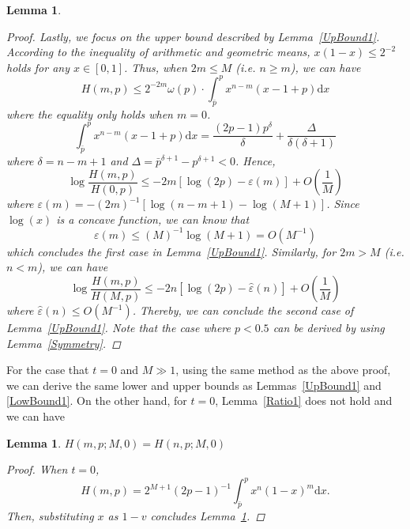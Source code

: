 \documentclass{article}
\newtheorem{lemma}[theorem]{Lemma}
\begin{document}
\begin{lemma}
\begin{proof}
Lastly, we focus on the upper bound described by Lemma~\ref{UpBound1}. According to the inequality of arithmetic and geometric means, $x(1-x)\leq 2^{-2}$ holds for any $x\in [0,1]$. Thus, when $2m\leq M$ (i.e. $n\geq m$), we can have
\begin{equation}
H(m,p)\leq 2^{-2m}\omega(p)\cdot \int_{\bar{p}}^{p}x^{n-m}(x-1+p)\mathrm{d}x
\end{equation}
where the equality only holds when $m=0$.
\begin{equation}
 \int_{\bar{p}}^{p}x^{n-m}(x-1+p)\mathrm{d}x=\frac{(2p-1)p^{\delta}}{\delta}+\frac{\Delta}{\delta(\delta+1)}
\end{equation}
where $\delta=n-m+1$ and $\Delta=\bar{p}^{\delta+1}-p^{\delta+1}<0$. Hence,
\begin{equation}
\log\frac{H(m,p)}{H(0,p)}\leq -2m[\log(2p)-\varepsilon(m)] + O\left(\frac{1}{M}\right)
\end{equation}
where $\varepsilon(m)=-(2m)^{-1}[\log(n-m+1)-\log(M+1)]$. Since $\log(x)$ is a concave function, we can know that
\begin{equation}
\varepsilon(m)\leq (M)^{-1}\log(M+1)=O\left(M^{-1}\right)
\end{equation}
which concludes the first case in Lemma~\ref{UpBound1}. Similarly, for $2m>M$ (i.e. $n<m$), we can have
\begin{equation}
\log\frac{H(m,p)}{H(M,p)}\leq -2n[\log(2p)-\hat{\varepsilon}(n)] + O\left(\frac{1}{M}\right)
\end{equation}
where $\hat{\varepsilon}(n)\leq O(M^{-1})$. Thereby, we can conclude the second case of Lemma~\ref{UpBound1}. Note that the case where $p<0.5$ can be derived by using Lemma~\ref{Symmetry}.
\end{proof}
\end{lemma}
For the case that $t=0$ and $M\gg 1$, using the same method as the above proof, we can derive the same lower and upper bounds as Lemmas~\ref{UpBound1} and \ref{LowBound1}. On the other hand, for $t=0$, Lemma~\ref{Ratio1} does not hold and we can have
\begin{lemma}
\label{Ratio0}
$H(m,p;M,0)=H(n,p;M,0)$
\begin{proof}
When $t=0$,
\begin{equation}
H(m,p)=2^{M+1}(2p-1)^{-1}\int_{\bar{p}}^{p}x^n(1-x)^m\mathrm{d}x.
\end{equation}
Then, substituting $x$ as $1-v$ concludes Lemma~\ref{Ratio0}.
\end{proof}
\end{lemma}

%




\end{document}
